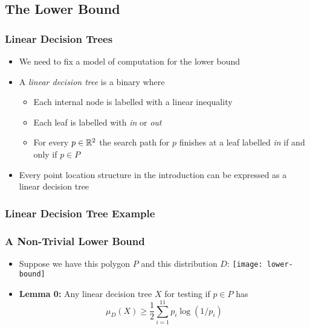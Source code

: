\documentclass{beamer}
\begin{document}
\subsection{The Lower Bound}
\frame
{
   \frametitle{Linear Decision Trees}
   \begin{itemize}
     \item<1-> We need to fix a model of computation for the lower bound
     \item<2-> A \emph{linear decision tree} is a binary where
       \begin{itemize}
          \item Each internal node is labelled with a linear inequality
          \item Each leaf is labelled with \emph{in} or \emph{out}
          \item For every $p\in\mathbb{R}^2$ the search path for $p$ finishes at 
           a leaf labelled \emph{in} if and only if $p\in P$
       \end{itemize}
     \item<3-> Every point location structure in the
	introduction can be expressed as a linear decision tree
   \end{itemize}
}

\frame
{
	\frametitle{Linear Decision Tree Example}
}


\frame
{
	\frametitle{A Non-Trivial Lower Bound}
        \begin{itemize}
          \item<1-> Suppose we have this polygon $P$ and this distribution $D$:
            \texttt{[image: lower-bound]}
          \item<2-> \textbf{Lemma 0:} Any linear decision tree $X$ for
testing if $p\in P$ has 
\[  \mu_D(X)\ge \frac{1}{2}\sum_{i=1}^{11} p_i\log(1/p_i)  \]
        \end{itemize} 
}
\end{document}
